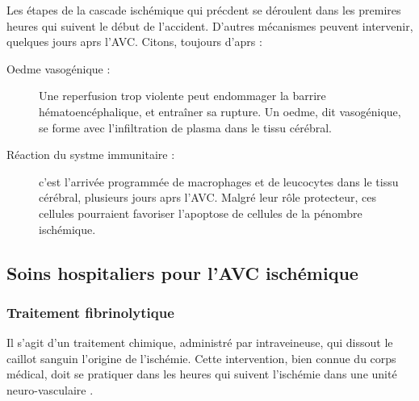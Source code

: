 
Les \'etapes de la cascade isch\'emique qui pr\'ecdent se d\'eroulent dans les premires heures qui suivent le d\'ebut de l'accident. %
D'autres m\'ecanismes peuvent intervenir, quelques jours aprs l'AVC. Citons, toujours d'aprs \cite{Durukan_PBB_07} :

\begin{description}
\item[Oedme vasog\'enique :] Une reperfusion trop violente peut endommager la barrire h\'ematoenc\'ephalique, et entra\^iner sa rupture. %
Un oedme, dit vasog\'enique, se forme avec l'infiltration de plasma dans le tissu c\'er\'ebral.
\item[R\'eaction du systme immunitaire :] c'est l'arriv\'ee programm\'ee de macrophages et de leucocytes dans le tissu c\'er\'ebral, plusieurs jours aprs l'AVC. %
Malgr\'e leur r\^ole protecteur, ces cellules pourraient favoriser l'apoptose de cellules de la p\'enombre isch\'emique.
\end{description}

\subsection{Soins hospitaliers pour l'AVC isch\'emique}
%

\subsubsection{Traitement fibrinolytique}

Il s'agit d'un traitement chimique, administr\'e par intraveineuse, qui dissout le caillot sanguin  l'origine de l'isch\'emie. %
Cette intervention, bien connue du corps m\'edical, doit se pratiquer dans les heures qui suivent l'isch\'emie dans une unit\'e neuro-vasculaire \cite{lar_poly_09}.

